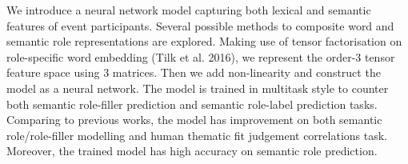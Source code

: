 We introduce a neural network model capturing both lexical and semantic features of event participants. Several possible methods to composite word and semantic role representations are explored. Making use of tensor factorisation on role-specific word embedding (Tilk et al. 2016), we represent the order-3 tensor feature space using 3 matrices. Then we add non-linearity and construct the model as a neural network. The model is trained in multitask style to counter both semantic role-filler prediction and semantic role-label prediction tasks. Comparing to previous works, the model has improvement on both semantic role/role-filler modelling and human thematic fit judgement correlations task. Moreover, the trained model has high accuracy on semantic role prediction. 